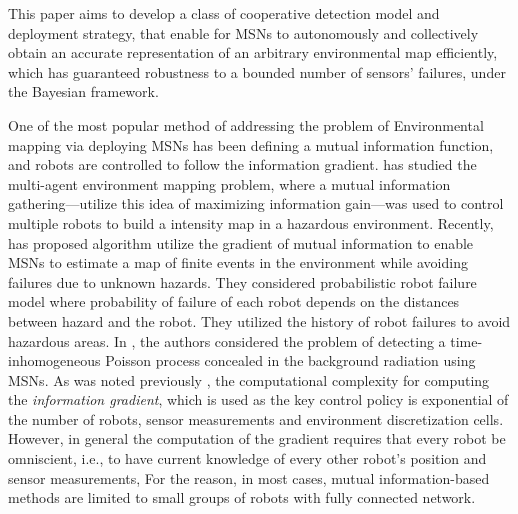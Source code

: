 \documentclass[letterpaper, 10 pt, conference]{ieeeconf}
\begin{document}
This paper aims to develop a class of cooperative detection model and deployment strategy, that enable for MSNs to autonomously and collectively obtain an accurate representation of an arbitrary environmental map efficiently, which has guaranteed robustness to a bounded number of sensors' failures, under the Bayesian framework.





One of the most popular method of addressing the problem of Environmental mapping via deploying MSNs has been defining a mutual information function, and robots are controlled to follow the information gradient.
\cite{cortez2011information} has studied the multi-agent environment mapping problem, where  a mutual information gathering---utilize this idea of maximizing information gain---was used to control multiple robots to build a intensity map in a hazardous environment. Recently, \cite{schwager2017multi} has proposed algorithm utilize the gradient of mutual information to enable MSNs to estimate a map of finite events in the environment while avoiding failures due to unknown hazards. They considered probabilistic robot failure model where probability of failure of each robot depends on the distances between hazard and the robot. They utilized the history of robot failures to avoid hazardous areas. In \cite{pahlajani2014networked}, the authors considered the problem of detecting a time-inhomogeneous Poisson process concealed in the background radiation using MSNs. As was noted previously \cite{schwager2017multi, julian2012distributed}, the computational complexity for computing the \emph{information gradient}, which is used as the key control policy is exponential of the number of robots, sensor measurements and environment discretization cells. 
However, in general the computation of the gradient requires that every robot be omniscient, i.e., to have current knowledge of every other robot’s position and sensor measurements, For the reason, in most cases, mutual information-based methods are limited to small groups of robots with fully connected network. 
\end{document}
